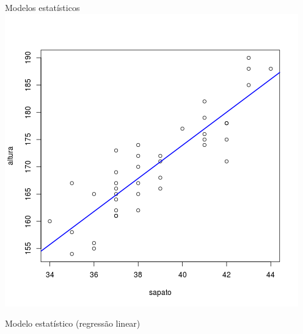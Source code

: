 \documentclass{beamer}
\begin{document}
\begin{frame}{Modelos estatísticos}
  \centering
  \includegraphics[height=.9\textheight]{modelos/alturas_sapatos}

Modelo estatístico (regressão linear)
\end{frame}
\end{document}
